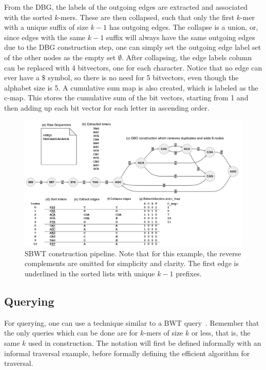From the DBG, the labels of the outgoing edges are extracted and associated with the sorted $k$-mers.
These are then collapsed, such that only the first $k$-mer with a unique suffix of size $k-1$ has outgoing edges.
The collapse is a union, or, since edges with the same $k-1$ suffix will always have the same outgoing edges due to the DBG construction step, one can simply set the outgoing edge label set of the other nodes as the empty set $\emptyset$.
After collapsing, the edge labels column can be replaced with 4 bitvectors, one for each character.
Notice that no edge can ever have a $\$$ symbol, so there is no need for 5 bitvectors, even though the alphabet size is 5.
A cumulative sum map is also created, which is labeled as the c-map.
This stores the cumulative sum of the bit vectors, starting from 1 and then adding up each bit vector for each letter in ascending order.

\begin{figure}[t]
  \centering
  \includegraphics[width=\textwidth]{images/SbwtConstruction.png}
  \caption{SBWT construction pipeline. Note that for this example, the reverse complements are omitted for simplicity and clarity. The first edge is underlined in the sorted lists with unique $k-1$ prefixes.}\label{fig:SbwtConstruction}
\end{figure}

\subsection{Querying}\label{sec:SBWTQuerying}

For querying, one can use a technique similar to a BWT query~\cite{BWT}.
Remember that the only queries which can be done are for $k$-mers of size $k$ or less, that is, the same $k$ used in construction.
The notation will first be defined informally with an informal traversal example, before formally defining the efficient algorithm for traversal.


